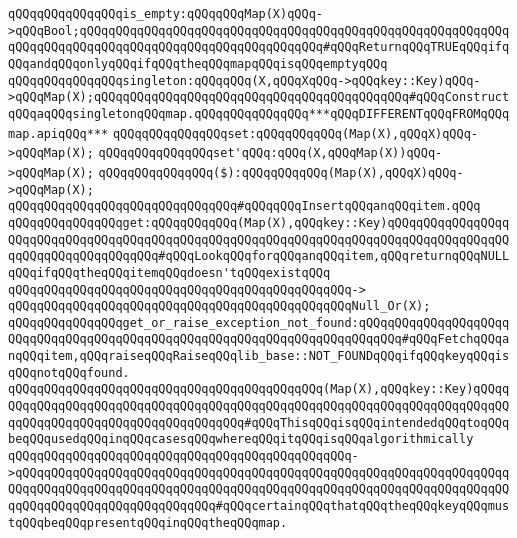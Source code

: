 \newline
\verb|qQQqqQQqqQQqqQQqis_empty:qQQqqQQqMap(X)qQQq->qQQqBool;qQQqqQQqqQQqqQQqqQQqqQQqqQQqqQQqqQQqqQQqqQQqqQQqqQQqqQQqqQQqqQQqqQQqqQQqqQQqqQQqqQQqqQQqqQQqqQQqqQQqqQQq#qQQqReturnqQQqTRUEqQQqifqQQqandqQQqonlyqQQqifqQQqtheqQQqmapqQQqisqQQqemptyqQQq|\newline
\newline
\verb|qQQqqQQqqQQqqQQqsingleton:qQQqqQQq(X,qQQqXqQQq->qQQqkey::Key)qQQq->qQQqMap(X);qQQqqQQqqQQqqQQqqQQqqQQqqQQqqQQqqQQqqQQqqQQq#qQQqConstructqQQqaqQQqsingletonqQQqmap.qQQqqQQqqQQqqQQq***qQQqDIFFERENTqQQqFROMqQQqmap.apiqQQq***|\newline
\newline
\verb|qQQqqQQqqQQqqQQqset:qQQqqQQqqQQq(Map(X),qQQqX)qQQq->qQQqMap(X);|\newline
\verb|qQQqqQQqqQQqqQQqset'qQQq:qQQq(X,qQQqMap(X))qQQq->qQQqMap(X);|\newline
\verb|qQQqqQQqqQQqqQQq($):qQQqqQQqqQQq(Map(X),qQQqX)qQQq->qQQqMap(X);|\newline
\verb|qQQqqQQqqQQqqQQqqQQqqQQqqQQqqQQq#qQQqqQQqInsertqQQqanqQQqitem.qQQq|\newline
\newline
\verb|qQQqqQQqqQQqqQQqget:qQQqqQQqqQQq(Map(X),qQQqkey::Key)qQQqqQQqqQQqqQQqqQQqqQQqqQQqqQQqqQQqqQQqqQQqqQQqqQQqqQQqqQQqqQQqqQQqqQQqqQQqqQQqqQQqqQQqqQQqqQQqqQQqqQQqqQQq#qQQqLookqQQqforqQQqanqQQqitem,qQQqreturnqQQqNULLqQQqifqQQqtheqQQqitemqQQqdoesn'tqQQqexistqQQq|\newline
\verb|qQQqqQQqqQQqqQQqqQQqqQQqqQQqqQQqqQQqqQQqqQQqqQQq->|\newline
\verb|qQQqqQQqqQQqqQQqqQQqqQQqqQQqqQQqqQQqqQQqqQQqqQQqNull_Or(X);|\newline
\newline
\verb|qQQqqQQqqQQqqQQqget_or_raise_exception_not_found:qQQqqQQqqQQqqQQqqQQqqQQqqQQqqQQqqQQqqQQqqQQqqQQqqQQqqQQqqQQqqQQqqQQqqQQqqQQq#qQQqFetchqQQqanqQQqitem,qQQqraiseqQQqRaiseqQQqlib_base::NOT_FOUNDqQQqifqQQqkeyqQQqisqQQqnotqQQqfound.|\newline
\verb|qQQqqQQqqQQqqQQqqQQqqQQqqQQqqQQqqQQqqQQqqQQq(Map(X),qQQqkey::Key)qQQqqQQqqQQqqQQqqQQqqQQqqQQqqQQqqQQqqQQqqQQqqQQqqQQqqQQqqQQqqQQqqQQqqQQqqQQqqQQqqQQqqQQqqQQqqQQqqQQqqQQqqQQq#qQQqThisqQQqisqQQqintendedqQQqtoqQQqbeqQQqusedqQQqinqQQqcasesqQQqwhereqQQqitqQQqisqQQqalgorithmically|\newline
\verb|qQQqqQQqqQQqqQQqqQQqqQQqqQQqqQQqqQQqqQQqqQQqqQQq->qQQqqQQqqQQqqQQqqQQqqQQqqQQqqQQqqQQqqQQqqQQqqQQqqQQqqQQqqQQqqQQqqQQqqQQqqQQqqQQqqQQqqQQqqQQqqQQqqQQqqQQqqQQqqQQqqQQqqQQqqQQqqQQqqQQqqQQqqQQqqQQqqQQqqQQqqQQqqQQqqQQqqQQq#qQQqcertainqQQqthatqQQqtheqQQqkeyqQQqmustqQQqbeqQQqpresentqQQqinqQQqtheqQQqmap.|\newline

